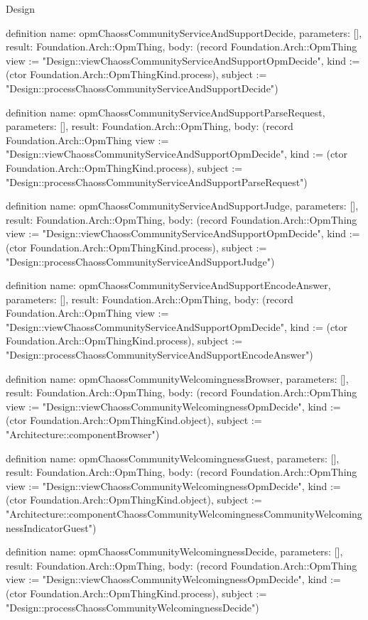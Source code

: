 \begin{lexlean}{Design}
\begin{semanticmodule}
definition{
  name: opmChaossCommunityServiceAndSupportDecide,
  parameters: [],
  result: Foundation.Arch::OpmThing,
  body: (record Foundation.Arch::OpmThing {view := "Design::viewChaossCommunityServiceAndSupportOpmDecide", kind := (ctor Foundation.Arch::OpmThingKind.process), subject := "Design::processChaossCommunityServiceAndSupportDecide"})
}

definition{
  name: opmChaossCommunityServiceAndSupportParseRequest,
  parameters: [],
  result: Foundation.Arch::OpmThing,
  body: (record Foundation.Arch::OpmThing {view := "Design::viewChaossCommunityServiceAndSupportOpmDecide", kind := (ctor Foundation.Arch::OpmThingKind.process), subject := "Design::processChaossCommunityServiceAndSupportParseRequest"})
}

definition{
  name: opmChaossCommunityServiceAndSupportJudge,
  parameters: [],
  result: Foundation.Arch::OpmThing,
  body: (record Foundation.Arch::OpmThing {view := "Design::viewChaossCommunityServiceAndSupportOpmDecide", kind := (ctor Foundation.Arch::OpmThingKind.process), subject := "Design::processChaossCommunityServiceAndSupportJudge"})
}

definition{
  name: opmChaossCommunityServiceAndSupportEncodeAnswer,
  parameters: [],
  result: Foundation.Arch::OpmThing,
  body: (record Foundation.Arch::OpmThing {view := "Design::viewChaossCommunityServiceAndSupportOpmDecide", kind := (ctor Foundation.Arch::OpmThingKind.process), subject := "Design::processChaossCommunityServiceAndSupportEncodeAnswer"})
}

definition{
  name: opmChaossCommunityWelcomingnessBrowser,
  parameters: [],
  result: Foundation.Arch::OpmThing,
  body: (record Foundation.Arch::OpmThing {view := "Design::viewChaossCommunityWelcomingnessOpmDecide", kind := (ctor Foundation.Arch::OpmThingKind.object), subject := "Architecture::componentBrowser"})
}

definition{
  name: opmChaossCommunityWelcomingnessGuest,
  parameters: [],
  result: Foundation.Arch::OpmThing,
  body: (record Foundation.Arch::OpmThing {view := "Design::viewChaossCommunityWelcomingnessOpmDecide", kind := (ctor Foundation.Arch::OpmThingKind.object), subject := "Architecture::componentChaossCommunityWelcomingnessCommunityWelcomingnessIndicatorGuest"})
}

definition{
  name: opmChaossCommunityWelcomingnessDecide,
  parameters: [],
  result: Foundation.Arch::OpmThing,
  body: (record Foundation.Arch::OpmThing {view := "Design::viewChaossCommunityWelcomingnessOpmDecide", kind := (ctor Foundation.Arch::OpmThingKind.process), subject := "Design::processChaossCommunityWelcomingnessDecide"})
}


\end{semanticmodule}
\end{lexlean}
